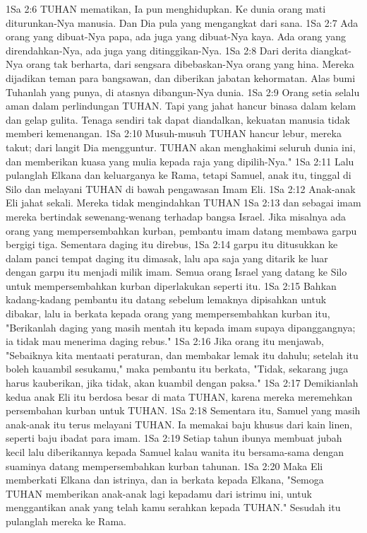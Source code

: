 1Sa 2:6  TUHAN mematikan, Ia pun menghidupkan. Ke dunia orang mati diturunkan-Nya manusia. Dan Dia pula yang mengangkat dari sana.
1Sa 2:7  Ada orang yang dibuat-Nya papa, ada juga yang dibuat-Nya kaya. Ada orang yang direndahkan-Nya, ada juga yang ditinggikan-Nya.
1Sa 2:8  Dari derita diangkat-Nya orang tak berharta, dari sengsara dibebaskan-Nya orang yang hina. Mereka dijadikan teman para bangsawan, dan diberikan jabatan kehormatan. Alas bumi Tuhanlah yang punya, di atasnya dibangun-Nya dunia.
1Sa 2:9  Orang setia selalu aman dalam perlindungan TUHAN. Tapi yang jahat hancur binasa dalam kelam dan gelap gulita. Tenaga sendiri tak dapat diandalkan, kekuatan manusia tidak memberi kemenangan.
1Sa 2:10  Musuh-musuh TUHAN hancur lebur, mereka takut; dari langit Dia mengguntur. TUHAN akan menghakimi seluruh dunia ini, dan memberikan kuasa yang mulia kepada raja yang dipilih-Nya."
1Sa 2:11  Lalu pulanglah Elkana dan keluarganya ke Rama, tetapi Samuel, anak itu, tinggal di Silo dan melayani TUHAN di bawah pengawasan Imam Eli.
1Sa 2:12  Anak-anak Eli jahat sekali. Mereka tidak mengindahkan TUHAN
1Sa 2:13  dan sebagai imam mereka bertindak sewenang-wenang terhadap bangsa Israel. Jika misalnya ada orang yang mempersembahkan kurban, pembantu imam datang membawa garpu bergigi tiga. Sementara daging itu direbus,
1Sa 2:14  garpu itu ditusukkan ke dalam panci tempat daging itu dimasak, lalu apa saja yang ditarik ke luar dengan garpu itu menjadi milik imam. Semua orang Israel yang datang ke Silo untuk mempersembahkan kurban diperlakukan seperti itu.
1Sa 2:15  Bahkan kadang-kadang pembantu itu datang sebelum lemaknya dipisahkan untuk dibakar, lalu ia berkata kepada orang yang mempersembahkan kurban itu, "Berikanlah daging yang masih mentah itu kepada imam supaya dipanggangnya; ia tidak mau menerima daging rebus."
1Sa 2:16  Jika orang itu menjawab, "Sebaiknya kita mentaati peraturan, dan membakar lemak itu dahulu; setelah itu boleh kauambil sesukamu," maka pembantu itu berkata, "Tidak, sekarang juga harus kauberikan, jika tidak, akan kuambil dengan paksa."
1Sa 2:17  Demikianlah kedua anak Eli itu berdosa besar di mata TUHAN, karena mereka meremehkan persembahan kurban untuk TUHAN.
1Sa 2:18  Sementara itu, Samuel yang masih anak-anak itu terus melayani TUHAN. Ia memakai baju khusus dari kain linen, seperti baju ibadat para imam.
1Sa 2:19  Setiap tahun ibunya membuat jubah kecil lalu diberikannya kepada Samuel kalau wanita itu bersama-sama dengan suaminya datang mempersembahkan kurban tahunan.
1Sa 2:20  Maka Eli memberkati Elkana dan istrinya, dan ia berkata kepada Elkana, "Semoga TUHAN memberikan anak-anak lagi kepadamu dari istrimu ini, untuk menggantikan anak yang telah kamu serahkan kepada TUHAN." Sesudah itu pulanglah mereka ke Rama.
